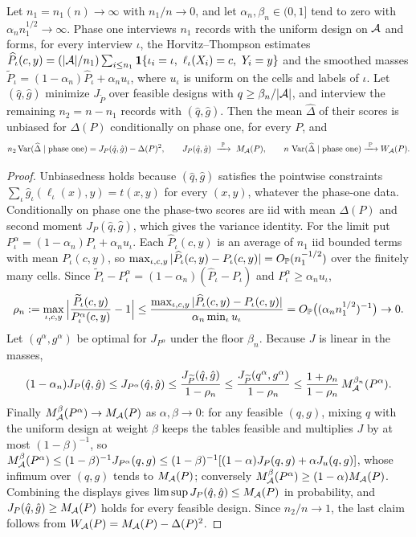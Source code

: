 \begin{proposition}\label{prop:selfcal}
Let $n_1=n_1(n)\to\infty$ with $n_1/n\to0$, and let $\alpha_n,\beta_n\in(0,1]$
tend to zero with $\alpha_n n_1^{1/2}\to\infty$. Phase one interviews $n_1$
records with the uniform design on $\mathcal A$ and forms, for every interview $\iota$,
the Horvitz--Thompson estimates
$\widehat P_\iota(c,y)=(|\A|/n_1)\sum_{i\le n_1}\mathbf 1\{\iota_i=\iota,\ \ell_\iota(X_i)=c,\ Y_i=y\}$
and the smoothed masses $\widetilde P_\iota=(1-\alpha_n)\widehat P_\iota+\alpha_n u_\iota$,
where $u_\iota$ is uniform on the cells and labels of $\iota$. Let
$(\hat q,\hat g)$ minimize $J_{\widetilde P}$ over feasible designs with
$q\ge\beta_n/|\mathcal A|$, and interview the remaining $n_2=n-n_1$ records with
$(\hat q,\hat g)$. Then the mean $\widehat\Delta$ of their scores is
unbiased for $\Delta(P)$ conditionally on phase one, for every $P$, and
\[
 n_2\Var(\widehat\Delta\mid\text{phase one})=J_P(\hat q,\hat g)-\Delta(P)^2,
 \qquad J_P(\hat q,\hat g)\ \xrightarrow{\ \PP\ }\ M_\A(P),
 \qquad n\,\Var(\widehat\Delta\mid\text{phase one})\xrightarrow{\ \PP\ }W_\A(P).
\]
\end{proposition}
\begin{proof}
Unbiasedness holds because $(\hat q,\hat g)$ satisfies the pointwise
constraints $\sum_\iota\hat g_\iota(\ell_\iota(x),y)=t(x,y)$ for every $(x,y)$,
whatever the phase-one data. Conditionally on phase one the phase-two scores
are iid with mean $\Delta(P)$ and second moment $J_P(\hat q,\hat g)$, which
gives the variance identity. For the limit put $P^{\alpha}_\iota=(1-\alpha_n)P_\iota+\alpha_nu_\iota$.
Each $\widehat P_\iota(c,y)$ is an average of $n_1$ iid bounded terms with
mean $P_\iota(c,y)$, so $\max_{\iota,c,y}|\widehat P_\iota(c,y)-P_\iota(c,y)|=O_\mathbb P(n_1^{-1/2})$
over the finitely many cells. Since
$\widetilde P_\iota-P^\alpha_\iota=(1-\alpha_n)(\widehat P_\iota-P_\iota)$ and
$P^\alpha_\iota\ge\alpha_nu_\iota$,
\[
 \rho_n:=\max_{\iota,c,y}\Big|\frac{\widetilde P_\iota(c,y)}{P^\alpha_\iota(c,y)}-1\Big|
 \le\frac{\max_{\iota,c,y}|\widehat P_\iota(c,y)-P_\iota(c,y)|}{\alpha_n\min_\iota u_\iota}
 =O_\mathbb P\big((\alpha_nn_1^{1/2})^{-1}\big)\to0 .
\]
Let $(q^\alpha,g^\alpha)$ be optimal for $J_{P^\alpha}$ under the floor
$\beta_n$. Because $J$ is linear in the masses,
\[
 (1-\alpha_n)J_P(\hat q,\hat g)\le J_{P^\alpha}(\hat q,\hat g)\le\frac{J_{\widetilde P}(\hat q,\hat g)}{1-\rho_n}
 \le\frac{J_{\widetilde P}(q^\alpha,g^\alpha)}{1-\rho_n}\le\frac{1+\rho_n}{1-\rho_n}\,M^{\beta_n}_\mathcal A(P^{\alpha}) .
\]
Finally $M^{\beta}_\mathcal A(P^{\alpha})\to M_\mathcal A(P)$ as $\alpha,\beta\to0$: for any
feasible $(q,g)$, mixing $q$ with the uniform design at weight $\beta$ keeps
the tables feasible and multiplies $J$ by at most $(1-\beta)^{-1}$, so
$M_\mathcal A^\beta(P^\alpha)\le(1-\beta)^{-1}J_{P^\alpha}(q,g)\le(1-\beta)^{-1}[(1-\alpha)J_P(q,g)+\alpha J_{u}(q,g)]$,
whose infimum over $(q,g)$ tends to $M_\mathcal A(P)$; conversely
$M_\mathcal A^\beta(P^\alpha)\ge(1-\alpha)M_\mathcal A(P)$. Combining the displays gives
$\limsup J_P(\hat q,\hat g)\le M_\mathcal A(P)$ in probability, and
$J_P(\hat q,\hat g)\ge M_\mathcal A(P)$ holds for every feasible design.
Since $n_2/n\to1$, the last claim follows from
$W_\mathcal A(P)=M_\mathcal A(P)-\Delta(P)^2$.
\end{proof}

